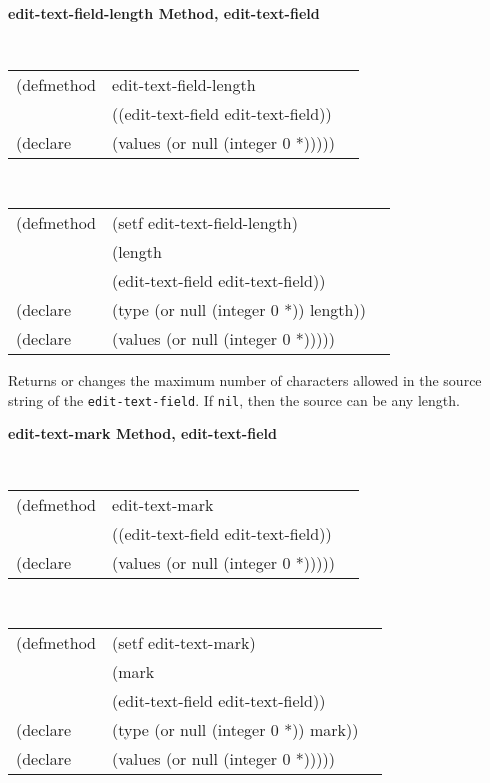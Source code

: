 {\samepage  
{\large {\bf edit-text-field-length \hfill Method, edit-text-field}}
\begin{flushright} \parbox[t]{6.125in}{
\tt
\begin{tabular}{lll}
\raggedright
(defmethod & edit-text-field-length & \\
& ((edit-text-field  edit-text-field)) \\
(declare & (values (or null (integer 0 *)))))
\end{tabular}
\rm

}\end{flushright}}

\begin{flushright} \parbox[t]{6.125in}{
\tt
\begin{tabular}{lll}
\raggedright
(defmethod & (setf edit-text-field-length) & \\
         & (length \\
         & (edit-text-field  edit-text-field)) \\
(declare &(type (or null (integer 0 *))  length))\\
(declare & (values (or null (integer 0 *)))))
\end{tabular}
\rm}
\end{flushright}

\begin{flushright} \parbox[t]{6.125in}{
Returns or changes the maximum number of characters allowed in the source string
of the {\tt edit-text-field}. If {\tt nil}, then the source can be any length.}
\end{flushright}

{\samepage  
{\large {\bf edit-text-mark \hfill Method, edit-text-field}}
\begin{flushright} \parbox[t]{6.125in}{
\tt
\begin{tabular}{lll}
\raggedright
(defmethod & edit-text-mark & \\
& ((edit-text-field  edit-text-field)) \\
(declare & (values (or null (integer 0 *)))))
\end{tabular}
\rm

}\end{flushright}}

\begin{flushright} \parbox[t]{6.125in}{
\tt
\begin{tabular}{lll}
\raggedright
(defmethod & (setf edit-text-mark) & \\
         & (mark \\
         & (edit-text-field  edit-text-field)) \\
(declare &(type (or null (integer 0 *))  mark))\\
(declare & (values (or null (integer 0 *)))))
\end{tabular}
\rm}
\end{flushright}

